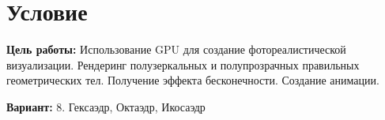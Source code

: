 \section{Условие}
\textbf{Цель работы:} Использование GPU для создание фотореалистической визуализации. Рендеринг полузеркальных и полупрозрачных правильных геометрических тел. Получение эффекта бесконечности. Создание анимации.

\textbf{Вариант:} 8. Гексаэдр, Октаэдр, Икосаэдр
